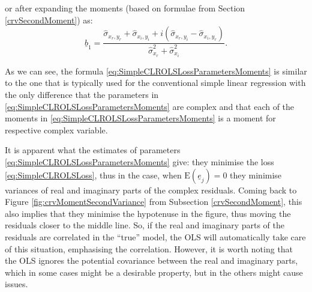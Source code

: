 \documentclass[
]{book}
\begin{document}
or after expanding the moments (based on formulae from Section \ref{crvSecondMoment}) as:
\begin{equation}
        \underline{b}_1 = \frac{\hat{\sigma}_{x_r, y_r} + \hat{\sigma}_{x_i, y_i} + i (\hat{\sigma}_{x_r, y_i} - \hat{\sigma}_{x_i, y_r})}{\hat{\sigma}_{x_r}^2 + \hat{\sigma}_{x_i}^2} .
    \label{eq:SimpleCLROLSLossParametersMomentsExpanded}
\end{equation}

As we can see, the formula \eqref{eq:SimpleCLROLSLossParametersMoments} is similar to the one that is typically used for the conventional simple linear regression with the only difference that the parameters in \eqref{eq:SimpleCLROLSLossParametersMoments} are complex and that each of the moments in \eqref{eq:SimpleCLROLSLossParametersMoments} is a moment for respective complex variable.

It is apparent what the estimates of parameters \eqref{eq:SimpleCLROLSLossParametersMoments} give: they minimise the loss \eqref{eq:SimpleCLROLSLoss}, thus in the case, when \(\mathrm{E}(\underline{e}_j)=0\) they minimise variances of real and imaginary parts of the complex residuals. Coming back to Figure \ref{fig:crvMomentSecondVariance} from Subsection \ref{crvSecondMoment}, this also implies that they minimise the hypotenuse in the figure, thus moving the residuals closer to the middle line. So, if the real and imaginary parts of the residuals are correlated in the ``true'' model, the OLS will automatically take care of this situation, emphasising the correlation. However, it is worth noting that the OLS ignores the potential covariance between the real and imaginary parts, which in some cases might be a desirable property, but in the others might cause issues.
\end{document}
